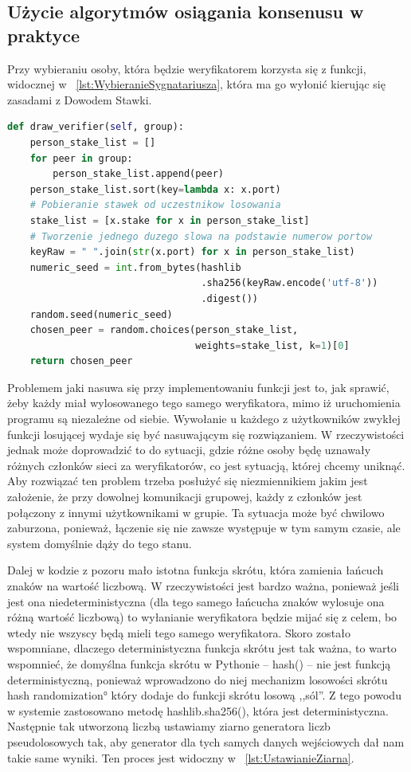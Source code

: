 \subsection{Użycie algorytmów osiągania konsenusu w praktyce}
\label{ssec:KonsensusUzycie}
Przy wybieraniu osoby, która będzie weryfikatorem korzysta się z funkcji, widocznej w \lstlistingname{~\ref{lst:WybieranieSygnatariusza}}, która ma go wyłonić kierując się zasadami z Dowodem Stawki.

\begin{lstlisting}[language=Python, extendedchars=true, caption={Funkcja wybierająca sygnatariusza}, label={lst:WybieranieSygnatariusza}]
def draw_verifier(self, group):
    person_stake_list = []
    for peer in group:
        person_stake_list.append(peer)
    person_stake_list.sort(key=lambda x: x.port)
    # Pobieranie stawek od uczestnikow losowania
    stake_list = [x.stake for x in person_stake_list]
    # Tworzenie jednego duzego slowa na podstawie numerow portow
    keyRaw = " ".join(str(x.port) for x in person_stake_list)
    numeric_seed = int.from_bytes(hashlib
                                  .sha256(keyRaw.encode('utf-8'))
                                  .digest())
    random.seed(numeric_seed)
    chosen_peer = random.choices(person_stake_list,
                                 weights=stake_list, k=1)[0]
    return chosen_peer
\end{lstlisting} 
 Problemem jaki nasuwa się przy implementowaniu funkcji jest to, jak sprawić, żeby każdy miał wylosowanego tego samego weryfikatora, mimo iż uruchomienia programu są niezależne od siebie. Wywołanie u każdego z użytkowników zwykłej funkcji losującej wydaje się być nasuwającym się rozwiązaniem. W rzeczywistości jednak może doprowadzić to do sytuacji, gdzie różne osoby będę uznawały różnych członków sieci za weryfikatorów, co jest sytuacją, której chcemy uniknąć. Aby rozwiązać ten problem trzeba posłużyć się niezmiennikiem jakim jest założenie, że przy dowolnej komunikacji grupowej, każdy z członków jest połączony z innymi użytkownikami w grupie. Ta sytuacja może być chwilowo zaburzona, ponieważ, łączenie się nie zawsze występuje w tym samym czasie, ale system domyślnie dąży do tego stanu.

Dalej w kodzie z pozoru mało istotna funkcja skrótu, która zamienia łańcuch znaków na wartość liczbową. W rzeczywistości jest bardzo ważna, ponieważ jeśli jest ona niedeterministyczna (dla tego samego łańcucha znaków wylosuje ona różną wartość liczbową) to wyłanianie weryfikatora będzie mijać się z celem, bo wtedy nie wszyscy będą mieli tego samego weryfikatora. Skoro zostało wspomniane, dlaczego deterministyczna funkcja skrótu jest tak ważna, to warto wspomnieć, że domyślna funkcja skrótu w Pythonie – hash() – nie jest funkcją deterministyczną, ponieważ wprowadzono do niej mechanizm losowości skrótu \ang{hash randomization} który dodaje do funkcji skrótu losową ,,sól”. Z tego powodu w systemie zastosowano metodę hashlib.sha256(), która jest deterministyczna. Następnie tak utworzoną liczbą ustawiamy ziarno generatora liczb pseudolosowych tak, aby generator dla tych samych danych wejściowych dał nam takie same wyniki. Ten proces jest widoczny w \lstlistingname{~\ref{lst:UstawianieZiarna}}.

